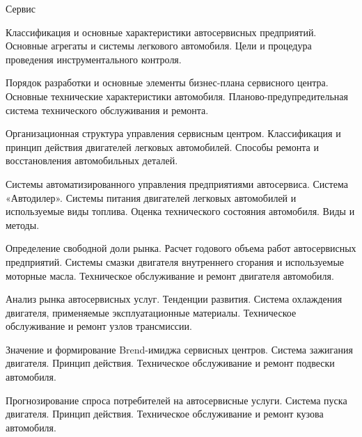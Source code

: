 \documentclass[
	11pt,
	a4paper,
	]
	{article}
\begin{document}
 {Сервис}

	

\noindent{} 
	{
		Классификация и основные характеристики автосервисных предприятий.
	}{
		Основные агрегаты и системы легкового автомобиля.
	}{
		Цели и процедура проведения инструментального контроля.
	}

\bigskip

\noindent{} 
	{
		Порядок разработки и основные элементы бизнес-плана сервисного центра.
	}{
		Основные технические характеристики автомобиля.
	}{
		Планово-предупредительная система технического обслуживания и ремонта.
	}

\bigskip

\noindent{} 
	{
		Организационная структура управления сервисным центром.
	}{
		Классификация и принцип действия двигателей легковых автомобилей.
	}{
		Способы ремонта и восстановления автомобильных деталей.
	}

\bigskip

\noindent{} 
	{
		Системы автоматизированного управления предприятиями автосервиса. Система «Автодилер».
	}{
		Системы питания двигателей легковых автомобилей и используемые виды топлива.
	}{
		Оценка технического состояния автомобиля. Виды и методы.
	}

\bigskip

\noindent{} 
	{
		Определение свободной доли рынка. Расчет годового объема работ автосервисных предприятий.
	}{
		Системы смазки двигателя внутреннего сгорания и используемые моторные масла.
	}{
		Техническое обслуживание и ремонт двигателя автомобиля.
	}

\bigskip

\noindent{} 
	{
		Анализ рынка автосервисных услуг. Тенденции развития.
	}{
		Система охлаждения двигателя, применяемые эксплуатационные материалы.
	}{
		Техническое обслуживание и ремонт узлов трансмиссии.
	}

\bigskip

\noindent{} 
	{
		Значение и формирование Brend-имиджа сервисных центров.
	}{
		Система зажигания двигателя. Принцип действия.
	}{
		Техническое обслуживание и ремонт подвески автомобиля.
	}

\bigskip

\noindent{} 
	{
		Прогнозирование спроса потребителей на автосервисные услуги.
	}{
		Система пуска двигателя. Принцип действия.
	}{
		Техническое обслуживание и ремонт кузова автомобиля.
	}

\bigskip
\end{document}
